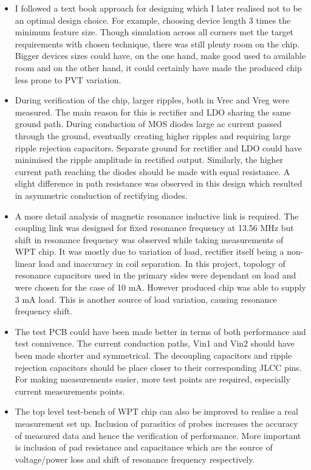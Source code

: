 \documentclass[UKenglish]{ifimaster}  %
\begin{document}
\begin{itemize}
\item I followed a text book approach for designing which I later realised not to be an optimal design choice. For example, choosing device length 3 times the minimum feature size. Though simulation across all corners 
met the target requirements with chosen technique, there was still plenty room on the chip. Bigger devices sizes could have, on the one hand, make good used to available room and on the other hand, it could certainly have made the produced chip less prone to PVT variation. 
\item During verification  of the chip, larger ripples, both in Vrec and Vreg were measured. The main reason for this is rectifier and LDO sharing the same ground path. 
During conduction of MOS diodes large ac current passed through the ground, eventually creating higher ripples and requiring large ripple rejection capacitors. Separate ground for rectifier and LDO could have minimised the ripple amplitude in rectified output. Similarly, the higher current path reaching the diodes should be made with equal resistance. A slight difference in path resistance was observed in this design which resulted in asymmetric conduction of rectifying diodes. 
\item A more detail analysis of magnetic resonance inductive link is required. The coupling link was designed for fixed resonance frequency at 13.56 MHz but shift in resonance frequency was observed while taking measurements of WPT chip. It was 
mostly due to variation of load, rectifier itself being a non-linear load and inaccuracy in coil separation. In this project, topology of resonance capacitors used in 
the primary sides were dependant on load and were chosen for the case of 10 mA. However produced chip was able to supply 3 mA load. This is another source of load variation, causing resonance frequency shift. 
\item The test PCB could have been made better in terms of both performance and test connivence. The current conduction paths, Vin1 and Vin2 should have been made shorter and symmetrical. The decoupling capacitors and ripple rejection capacitors should be place closer to their corresponding JLCC pins. For making measurements easier, more test points are required, especially current measurements points.
\item The top level test-bench of WPT chip can also be improved to realise a real measurement set up. Inclusion of parasitics of probes increases the accuracy of measured data and hence the verification of performance.  More important is inclusion of pad resistance and capacitance which are the source of voltage/power loss and 
shift of resonance frequency respectively.
\end{itemize}
\end{document}
